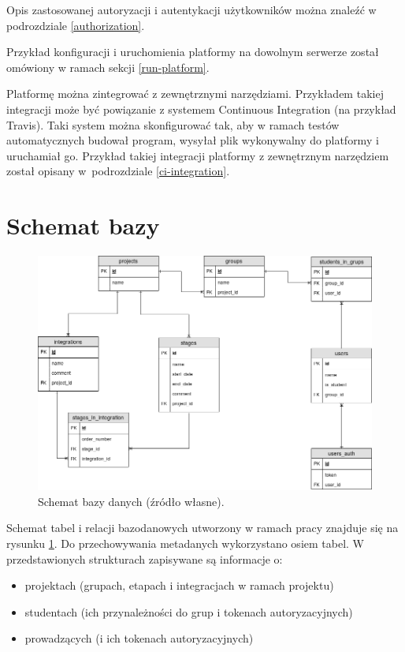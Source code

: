 Opis zastosowanej autoryzacji i autentykacji użytkowników można znaleźć w podrozdziale \ref{authorization}.

Przykład konfiguracji i uruchomienia platformy na dowolnym serwerze został omówiony w ramach sekcji \ref{run-platform}.

Platformę można zintegrować z zewnętrznymi narzędziami.
Przykładem takiej integracji może być powiązanie z systemem Continuous Integration (na przykład Travis).
Taki system można skonfigurować tak, aby w ramach testów automatycznych budował program, wysyłał plik wykonywalny do platformy i uruchamiał go.
Przykład takiej integracji platformy z zewnętrznym narzędziem został opisany w~podrozdziale \ref{ci-integration}.

\section{Schemat bazy}
\label{database}

\begin{figure}[h]
    \centering
    \includegraphics[width = 13cm]{chapter05/db_schema.png}
    \caption{Schemat bazy danych (źródło własne).}
    \label{fig:platform-db-schema}
\end{figure}

Schemat tabel i relacji bazodanowych utworzony w ramach pracy znajduje się na rysunku \ref{fig:platform-db-schema}.
Do przechowywania metadanych wykorzystano osiem tabel.
W przedstawionych strukturach zapisywane są informacje o:
\begin{itemize}
    \item projektach (grupach, etapach i integracjach w ramach projektu)
    \item studentach (ich przynależności do grup i tokenach autoryzacyjnych)
    \item prowadzących (i ich tokenach autoryzacyjnych)
\end{itemize}


